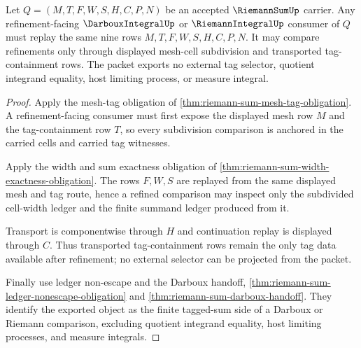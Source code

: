 \begin{theorem}
\label{thm:riemann-sum-tagless-refinement-ledger}
Let $Q=(M,T,F,W,S,H,C,P,N)$ be an accepted $\RiemannSumUp$ carrier. Any refinement-facing $\DarbouxIntegralUp$ or $\RiemannIntegralUp$ consumer of $Q$ must replay the same nine rows $M,T,F,W,S,H,C,P,N$. It may compare refinements only through displayed mesh-cell subdivision and transported tag-containment rows. The packet exports no external tag selector, quotient integrand equality, host limiting process, or measure integral.
\end{theorem}
\begin{proof}
Apply the mesh-tag obligation of \autoref{thm:riemann-sum-mesh-tag-obligation}. A refinement-facing consumer must first expose the displayed mesh row $M$ and the tag-containment row $T$, so every subdivision comparison is anchored in the carried cells and carried tag witnesses.

Apply the width and sum exactness obligation of \autoref{thm:riemann-sum-width-exactness-obligation}. The rows $F,W,S$ are replayed from the same displayed mesh and tag route, hence a refined comparison may inspect only the subdivided cell-width ledger and the finite summand ledger produced from it.

Transport is componentwise through $H$ and continuation replay is displayed through $C$. Thus transported tag-containment rows remain the only tag data available after refinement; no external selector can be projected from the packet.

Finally use ledger non-escape and the Darboux handoff, \autoref{thm:riemann-sum-ledger-nonescape-obligation} and \autoref{thm:riemann-sum-darboux-handoff}. They identify the exported object as the finite tagged-sum side of a Darboux or Riemann comparison, excluding quotient integrand equality, host limiting processes, and measure integrals.
\end{proof}

